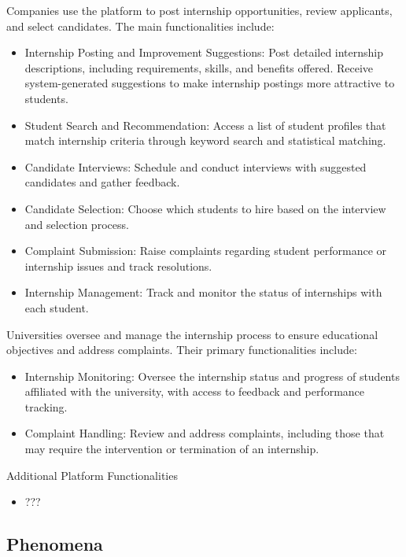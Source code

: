Companies use the platform to post internship opportunities, review applicants, and select candidates. The main functionalities include: \begin{itemize} 
\item Internship Posting and Improvement Suggestions: Post detailed internship descriptions, including requirements, skills, and benefits offered. Receive system-generated suggestions to make internship postings more attractive to students. 
\item Student Search and Recommendation: Access a list of student profiles that match internship criteria through keyword search and statistical matching. 
\item Candidate Interviews: Schedule and conduct interviews with suggested candidates and gather feedback. 
\item Candidate Selection: Choose which students to hire based on the interview and selection process. 
\item Complaint Submission: Raise complaints regarding student performance or internship issues and track resolutions. 
\item Internship Management: Track and monitor the status of internships with each student. 
\end{itemize}

Universities oversee and manage the internship process to ensure educational objectives and address complaints. Their primary functionalities include: 
\begin{itemize} 
\item Internship Monitoring: Oversee the internship status and progress of students affiliated with the university, with access to feedback and performance tracking. 
\item Complaint Handling: Review and address complaints, including those that may require the intervention or termination of an internship.
\end{itemize}

Additional Platform Functionalities
\begin{itemize} 
\item ???
\end{itemize}

\subsection{Phenomena}

